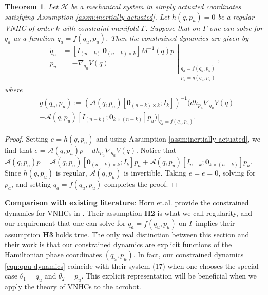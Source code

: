 \documentclass[journal,twoside,web]{ieeecolor}
\newtheorem{thm}{Theorem}%
\newcommand*{\inv}{^\mathsf{-1}}
\newcommand*{\Minv}{M^\mathsf{-1}}
\newcommand*{\Id}[1]{I_{#1}}
\newcommand*{\Zmat}[1]{\bm{0}_{#1}}
\begin{document}
\begin{thm}\label{thm:zero-dynamics}
    Let \(\mathcal{H}\) be a mechanical system in simply actuated
    coordinates satisfying Assumption \ref{assm:inertially-actuated}. 
    Let \(h(q,p_u) = 0\) be a regular VNHC of order \(k\) with constraint
    manifold \(\Gamma\). Suppose that on \(\Gamma\) one can solve for
    \(q_a\) as a function \(q_a = f(q_u,p_u)\).
    Then the constrained dynamics are given by
    \begin{equation}\label{eqn:qpu-dynamics}
        \left.\begin{aligned}
                \dot{q}_u &= 
                \left[\Id{(n-k)} ~ \Zmat{(n-k) \times k}\right]
                \Minv(q)p \\
            \dot{p}_u &= -\nabla_{q_u}V(q) \\
            \end{aligned}{}\right|_{\begin{array}{c}
                q_a = f(q_u,p_u) \\ 
                p_a = g(q_u,p_u) \\
            \end{array}}
            ,
    \end{equation}
    where
    \begin{align}\label{eqn:g-qpu}
        &g(q_u,p_u) := 
        \left(\mathcal{A}(q,p_u)[\Zmat{(n-k)\times k};\Id{k}] \right)\inv 
        (dh_{p_u} \nabla_{q_u}V(q) \nonumber
        \\
        &- \mathcal{A}(q,p_u)[\Id{(n-k)};\Zmat{k \times(n-k)}]p_u
        \left.)\right|_{q_a = f(q_u,p_u)}
        .
    \end{align}
\end{thm}
\begin{proof}
    Setting \(e = h(q,p_u)\) and using Assumption
    \ref{assm:inertially-actuated}, we find that
    \(\dot{e} = \mathcal{A}(q,p_u)p - dh_{p_u}\nabla_{q_u}V(q)\).
    Notice that
    \(\mathcal{A}(q,p_u)p = \mathcal{A}(q,p_u)[\Zmat{(n-k)\times k}; \Id{k}]p_a
    + \mathcal{A}(q,p_u)[\Id{n-k};\Zmat{k \times (n-k)}] p_u\).
    Since \(h(q,p_u)\) is regular, \(\mathcal{A}(q,p_u)\) is invertible.
    Taking \(e = \dot{e} = 0\), solving for \(p_a\), and setting 
    \(q_a = f(q_u,p_u)\) completes the proof.
\end{proof}

\textbf{Comparison with existing literature}: Horn et.al. provide the constrained
dynamics for VNHCs in \cite{nhvc_incline_walking}.
Their assumption \textbf{H2} is what we call regularity, and our requirement
that one can solve for \(q_a = f(q_u,p_u)\) on \(\Gamma\) implies their
assumption \textbf{H3} holds true.
The only real distinction between this section and their work
is that our constrained dynamics are explicit functions of the Hamiltonian phase
coordinates \((q_u,p_u)\).
In fact, our constrained dynamics \eqref{eqn:qpu-dynamics} coincide with their
system (17) when one chooses the special case \(\theta_1 = q_u\) and 
\(\theta_2 = p_u\).
This explicit representation will be beneficial when we apply the theory of
VNHCs to the acrobot.
\end{document}
